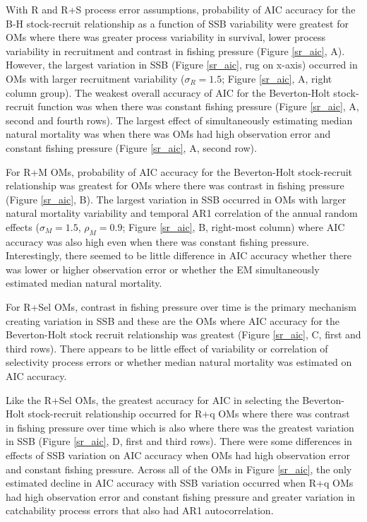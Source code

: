 \documentclass[
  12pt,
]{article}
\begin{document}
With R and R+S process error assumptions, probability of AIC accuracy
for the B-H stock-recruit relationship as a function of SSB variability
were greatest for OMs where there was greater process variability in
survival, lower process variability in recruitment and contrast in
fishing pressure (Figure \ref{sr_aic}, A). However, the largest
variation in SSB (Figure \ref{sr_aic}, rug on x-axis) occurred in OMs
with larger recruitment variability (\(\sigma_R = 1.5\); Figure
\ref{sr_aic}, A, right column group). The weakest overall accuracy of
AIC for the Beverton-Holt stock-recruit function was when there was
constant fishing pressure (Figure \ref{sr_aic}, A, second and fourth
rows). The largest effect of simultaneously estimating median natural
mortality was when there was OMs had high observation error and constant
fishing pressure (Figure \ref{sr_aic}, A, second row).

For R+M OMs, probability of AIC accuracy for the Beverton-Holt
stock-recruit relationship was greatest for OMs where there was contrast
in fishing pressure (Figure \ref{sr_aic}, B). The largest variation in
SSB occurred in OMs with larger natural mortality variability and
temporal AR1 correlation of the annual random effects
(\(\sigma_M = 1.5\), \(\rho_M = 0.9\); Figure \ref{sr_aic}, B,
right-most column) where AIC accuracy was also high even when there was
constant fishing pressure. Interestingly, there seemed to be little
difference in AIC accuracy whether there was lower or higher observation
error or whether the EM simultaneously estimated median natural
mortality.

For R+Sel OMs, contrast in fishing pressure over time is the primary
mechanism creating variation in SSB and these are the OMs where AIC
accuracy for the Beverton-Holt stock recruit relationship was greatest
(Figure \ref{sr_aic}, C, first and third rows). There appears to be
little effect of variability or correlation of selectivity process
errors or whether median natural mortality was estimated on AIC
accuracy.

Like the R+Sel OMs, the greatest accuracy for AIC in selecting the
Beverton-Holt stock-recruit relationship occurred for R+q OMs where
there was contrast in fishing pressure over time which is also where
there was the greatest variation in SSB (Figure \ref{sr_aic}, D, first
and third rows). There were some differences in effects of SSB variation
on AIC accuracy when OMs had high observation error and constant fishing
pressure. Across all of the OMs in Figure \ref{sr_aic}, the only
estimated decline in AIC accuracy with SSB variation occurred when R+q
OMs had high observation error and constant fishing pressure and greater
variation in catchability process errors that also had AR1
autocorrelation.
\end{document}
